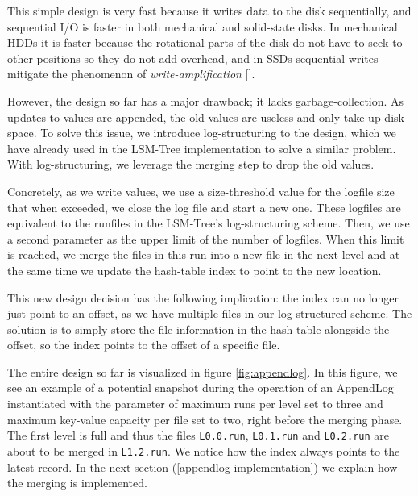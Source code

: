 This simple design is very fast because it writes data to the disk sequentially, and sequential I/O is faster in both mechanical and solid-state disks. In mechanical HDDs it is faster because the rotational parts of the disk do not have to seek to other positions so they do not add overhead, and in SSDs sequential writes mitigate the phenomenon of \textit{write-amplification} [\cite{write-amplification}].

However, the design so far has a major drawback; it lacks garbage-collection.
As updates to values are appended, the old values are useless and only take up disk space.
To solve this issue, we introduce log-structuring to the design, which we have already used in the LSM-Tree implementation to solve a similar problem.
With log-structuring, we leverage the merging step to drop the old values.

Concretely, as we write values, we use a size-threshold value for the logfile size that when exceeded, we close the log file and start a new one. These logfiles are equivalent to the runfiles in the LSM-Tree's log-structuring scheme.
Then, we use a second parameter as the upper limit of the number of logfiles.
When this limit is reached, we merge the files in this run into a new file in the next level and at the same time we update the hash-table index to point to the new location.

This new design decision has the following implication: the index can no longer just point to an offset, as we have multiple files in our log-structured scheme.
The solution is to simply store the file information in the hash-table alongside the offset, so the index points to the offset of a specific file.

The entire design so far is visualized in figure \ref{fig:appendlog}.
In this figure, we see an example of a potential snapshot during the operation of an AppendLog instantiated with the parameter of maximum runs per level set to three and maximum key-value capacity per file set to two, right before the merging phase. The first level is full and thus the files \verb|L0.0.run|, \verb|L0.1.run| and \verb|L0.2.run| are about to be merged in \verb|L1.2.run|.
We notice how the index always points to the latest record.
In the next section (\ref{appendlog-implementation}) we explain how the merging is implemented.

